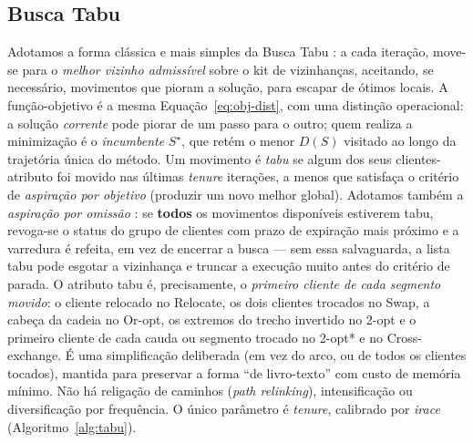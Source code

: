 \documentclass[12pt, a4paper]{article}
\begin{document}
\subsection{Busca Tabu}\label{sec:tabu}
Adotamos a forma clássica e mais simples da Busca Tabu \citep{glover1989tabu,glover1990tabu}: a cada iteração, move-se para o \emph{melhor vizinho admissível} sobre o kit de vizinhanças, aceitando, se necessário, movimentos que pioram a solução, para escapar de ótimos locais. A função-objetivo é a mesma Equação~\eqref{eq:obj-dist}, com uma distinção operacional: a solução \emph{corrente} pode piorar de um passo para o outro; quem realiza a minimização é o \emph{incumbente} $S^\star$, que retém o menor $D(S)$ visitado ao longo da trajetória única do método. Um movimento é \emph{tabu} se algum dos seus clientes-atributo foi movido nas últimas \textit{tenure} iterações, a menos que satisfaça o critério de \emph{aspiração por objetivo} (produzir um novo melhor global). Adotamos também a \emph{aspiração por omissão} \citep{glover1997tabu}: se \textbf{todos} os movimentos disponíveis estiverem tabu, revoga-se o status do grupo de clientes com prazo de expiração mais próximo e a varredura é refeita, em vez de encerrar a busca --- sem essa salvaguarda, a lista tabu pode esgotar a vizinhança e truncar a execução muito antes do critério de parada. O atributo tabu é, precisamente, o \emph{primeiro cliente de cada segmento movido}: o cliente relocado no Relocate, os dois clientes trocados no Swap, a cabeça da cadeia no Or-opt, os extremos do trecho invertido no 2-opt e o primeiro cliente de cada cauda ou segmento trocado no 2-opt\hspace{0.5pt}* e no Cross-exchange. É uma simplificação deliberada (em vez do arco, ou de todos os clientes tocados), mantida para preservar a forma ``de livro-texto'' com custo de memória mínimo. Não há religação de caminhos (\textit{path relinking}), intensificação ou diversificação por frequência. O único parâmetro é \textit{tenure}, calibrado por \textit{irace} (Algoritmo~\ref{alg:tabu}).

\begin{algorithm}[H]
\caption{\textsc{Busca-Tabu} --- forma clássica}\label{alg:tabu}
\begin{algorithmic}[1]
\label{t:init}
  \label{t:find}
  \label{t:revoke}
    \label{t:default}
  \ENDWHILE
    \label{t:exhaust}
  \ENDIF
  \label{t:apply}
    \label{t:improve}
  \ELSE
  \ENDIF
\ENDWHILE
{}
\end{algorithmic}
\end{algorithm}
\end{document}
